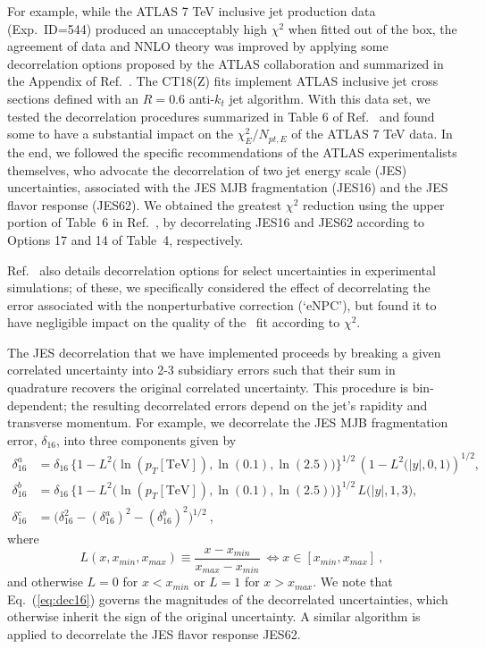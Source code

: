 For example, while the ATLAS 7 TeV inclusive jet production data \cite{Aad:2014vwa} (Exp.~ID=544) produced an unacceptably high $\chi^2$ when fitted out of the box, the agreement of data and NNLO theory was improved by applying some decorrelation options
proposed by the ATLAS collaboration and summarized in the Appendix of Ref.~\cite{Aaboud:2017dvo}. 
The CT18(Z) fits implement ATLAS inclusive jet cross sections defined with an $R=0.6$ anti-$k_t$ jet algorithm. With this data set, we tested
the decorrelation procedures summarized in Table 6 of Ref.~\cite{Aaboud:2017dvo} and 
found some to have a substantial impact on the $\chi^2_E/N_\mathit{pt,E}$ of the ATLAS 7 TeV data. In the end, we followed the specific recommendations
of the ATLAS experimentalists themselves, who advocate \cite{Bogdan} the decorrelation of two jet energy scale (JES) uncertainties, associated with the JES MJB fragmentation (JES16) and the JES flavor response
(JES62). We obtained the greatest $\chi^2$ reduction using the upper portion of Table~6 in Ref.~\cite{Aaboud:2017dvo},
by decorrelating JES16 and JES62 according to Options 17 and 14 of Table~4, respectively. 

Ref.~\cite{Aaboud:2017dvo}
also details decorrelation options for select uncertainties in experimental simulations; 
of these, we specifically considered the effect of
decorrelating the error associated with the nonperturbative correction (`eNPC'), but found it to have negligible impact
on the quality of the \CTHERAII~fit according to $\chi^2$. 

The JES decorrelation that we have implemented proceeds by breaking a given correlated uncertainty into 2-3 subsidiary errors such that their sum in quadrature recovers the original correlated uncertainty. This procedure is bin-dependent; the resulting decorrelated
errors depend on the jet's rapidity and transverse momentum. For example, we decorrelate the JES MJB fragmentation error, $\delta_{16}$, into
three components given by
\begin{align}
	\delta^a_{16} &= \delta_{16}\, \Big\{ 1 - L^2\big( \ln(p_T[\mathrm{TeV}]),\ln(0.1),\ln(2.5) \big) \Big\}^{1/2}\, \left( 1 - L^2\big(|y|,0,1\big) \right)^{1/2}, \nonumber \\
	\delta^b_{16} &= \delta_{16}\, \Big\{ 1 - L^2\big( \ln(p_T[\mathrm{TeV}]),\ln(0.1),\ln(2.5) \big) \Big\}^{1/2}\, L\big(|y|,1,3\big), \nonumber \\
	\delta^c_{16} &= \big( \delta^2_{16} - (\delta^a_{16})^2 - (\delta^b_{16})^2 \big)^{1/2}\ ,
\label{eq:dec16}
\end{align}
where
\begin{equation}
L(x,x_\mathit{min},x_\mathit{max}) \equiv \frac{x - x_\mathit{min}}{x_\mathit{max} - x_\mathit{min}}\ \iff x \in [x_\mathit{min},x_\mathit{max}]\ ,
\end{equation}
and otherwise $L = 0$ for $x < x_\mathit{min}$ or $L = 1$ for $x > x_\mathit{max}$. We note that Eq.~(\ref{eq:dec16}) governs the magnitudes of the decorrelated uncertainties, which otherwise
inherit the sign of the original uncertainty. A similar algorithm is applied to decorrelate the JES flavor response JES62.

